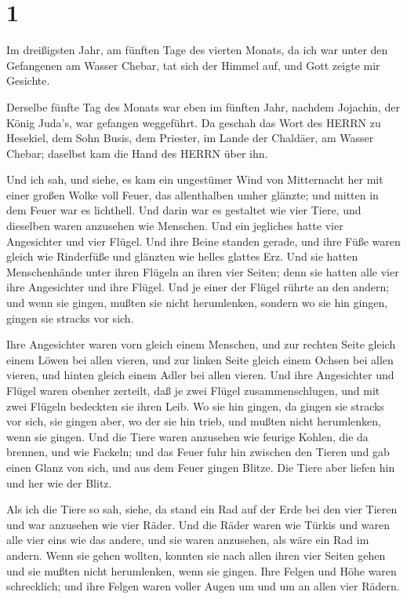 \hypertarget{section}{%
\section{1}\label{section}}

 Im dreißigsten Jahr, am fünften Tage des vierten Monats, da
ich war unter den Gefangenen am Wasser Chebar, tat sich der Himmel auf,
und Gott zeigte mir Gesichte.

 Derselbe fünfte Tag des Monats war eben im fünften Jahr,
nachdem Jojachin, der König Juda's, war gefangen weggeführt.
 Da geschah das Wort des HERRN zu Hesekiel, dem Sohn Busis,
dem Priester, im Lande der Chaldäer, am Wasser Chebar; daselbst kam die
Hand des HERRN über ihn.

 Und ich sah, und siehe, es kam ein ungestümer Wind von
Mitternacht her mit einer großen Wolke voll Feuer, das allenthalben
umher glänzte; und mitten in dem Feuer war es lichthell. 
Und darin war es gestaltet wie vier Tiere, und dieselben waren anzusehen
wie Menschen.  Und ein jegliches hatte vier Angesichter und
vier Flügel.  Und ihre Beine standen gerade, und ihre Füße
waren gleich wie Rinderfüße und glänzten wie helles glattes Erz.
 Und sie hatten Menschenhände unter ihren Flügeln an ihren
vier Seiten; denn sie hatten alle vier ihre Angesichter und ihre Flügel.
 Und je einer der Flügel rührte an den andern; und wenn sie
gingen, mußten sie nicht herumlenken, sondern wo sie hin gingen, gingen
sie stracks vor sich.

 Ihre Angesichter waren vorn gleich einem Menschen, und zur
rechten Seite gleich einem Löwen bei allen vieren, und zur linken Seite
gleich einem Ochsen bei allen vieren, und hinten gleich einem Adler bei
allen vieren.  Und ihre Angesichter und Flügel waren
obenher zerteilt, daß je zwei Flügel zusammenschlugen, und mit zwei
Flügeln bedeckten sie ihren Leib.  Wo sie hin gingen, da
gingen sie stracks vor sich, sie gingen aber, wo der sie hin trieb, und
mußten nicht herumlenken, wenn sie gingen.  Und die Tiere
waren anzusehen wie feurige Kohlen, die da brennen, und wie Fackeln; und
das Feuer fuhr hin zwischen den Tieren und gab einen Glanz von sich, und
aus dem Feuer gingen Blitze.  Die Tiere aber liefen hin und
her wie der Blitz.

 Als ich die Tiere so sah, siehe, da stand ein Rad auf der
Erde bei den vier Tieren und war anzusehen wie vier Räder. 
Und die Räder waren wie Türkis und waren alle vier eins wie das andere,
und sie waren anzusehen, als wäre ein Rad im andern.  Wenn
sie gehen wollten, konnten sie nach allen ihren vier Seiten gehen und
sie mußten nicht herumlenken, wenn sie gingen.  Ihre Felgen
und Höhe waren schrecklich; und ihre Felgen waren voller Augen um und um
an allen vier Rädern.

